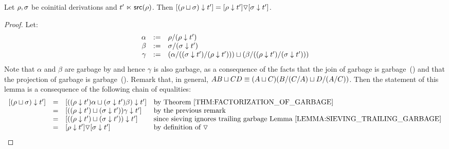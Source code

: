 \begin{lemma}
Let $\rho,\sigma$ be coinitial derivations and $t' \mathrel{\ltimes} \mathsf{src}(\rho)$.
Then ${[(\rho \sqcup \sigma) \downarrow t']} = {[\rho \downarrow t']} \triangledown {[\sigma\downarrow t']}$.
\end{lemma}
\begin{proof}
Let:
\[
  \begin{array}{rcl}
    \alpha & := & \rho/(\rho \downarrow t') \\
    \beta  & := & \sigma/(\sigma \downarrow t') \\
    \gamma & := & (\alpha/((\sigma \downarrow t')/(\rho \downarrow t'))) \sqcup (\beta/((\rho \downarrow t')/(\sigma \downarrow t'))) \\
  \end{array}
\]
Note that $\alpha$ and $\beta$ are garbage by 
and hence $\gamma$ is also garbage, as a consequence of
the facts that the join of garbage is garbage~()
and that the projection of garbage is garbage~().
Remark that, in general, $AB \sqcup CD \equiv (A \sqcup C)(B/(C/A) \sqcup D/(A/C))$.
Then the statement of this lemma is a consequence of the following chain of equalities:
\[
  \begin{array}{rcll}
  \cls{(\redseq \sqcup \redseqtwo) \sieve \tm'}
  & = &
  \cls{((\redseq \sieve \tm')\alpha \sqcup (\redseqtwo \sieve \tm')\beta) \sieve \tm'}
  & \text{by \rthm{factorization_of_garbage}}
  \\
  & = &
  \cls{((\redseq \sieve \tm') \sqcup (\redseqtwo \sieve \tm'))\gamma \sieve \tm'}
  & \text{by the previous remark}
  \\
  & = &
  \cls{((\redseq \sieve \tm') \sqcup (\redseqtwo \sieve \tm')) \sieve \tm'}
  & \text{since sieving ignores trailing garbage~\rlem{sieving_trailing_garbage}}
  \\
  & = & \cls{\redseq \sieve \tm'} \lorF \cls{\redseqtwo \sieve \tm'}
  & \text{by definition of $\lorF$}
  \end{array}
\]
\end{proof}

